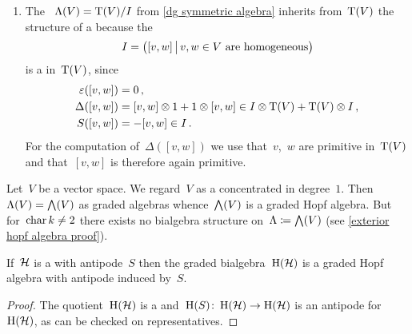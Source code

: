\documentclass[a4paper,10pt,headings=standardclasses]{scrartcl}
\begin{document}
\begin{example}
\begin{enumerate}
\[        (-1)^n
        v_n \dotsm v_1  \,.
      \]%
      It can now be checked on the monomials~$v_1 \dotsm v_n$ that~$S$ is an antipode for~$\dgTensor(V)$, making it a {\dgh}.
      (See \cref{examples for dgh proof} for the explicit calculations.)
    \item
      The {\dga}~$\operatorname{\Lambda}(V) = \operatorname{T}(V)/I$ from \cref{dg symmetric algebra} inherits from~$\dgTensor(V)$ the structure of a {\dgh} because the~{\dgi}
      \[
        I
        =
        \bigl(
          [v,w]
        \suchthat[\big]
          \text{$v,w \in V$ are homogeneous}
        \bigr)
      \]
      is a {\dghi} in~$\dgTensor(V)$, since
      \begin{align*}
        \varepsilon([v,w])
        &=
        0 \,,
      \\
        \Delta([v,w])
        &=
        [v,w] \otimes 1 + 1 \otimes [v,w]
        \in
        I \otimes \operatorname{T}(V) + \operatorname{T}(V) \otimes I \,,
      \\
        S([v,w])
        &=
        -[v,w]
        \in
        I \,.
      \end{align*}
      For the computation of~$\Delta([v,w])$ we use that~$v$,~$w$ are primitive in~$\dgTensor(V)$ and that~$[v,w]$ is therefore again primitive.
  \end{enumerate}
\end{example}

\begin{example}
  \label{exterior hopf algebra}
  Let~$V$ be a vector space.
  We regard~$V$ as a {\dgv} concentrated in degree~$1$.
  Then~$\operatorname{\Lambda}(V) = \bigwedge(V)$ as graded algebras whence~$\bigwedge(V)$ is a graded Hopf algebra.
  But for~$\operatorname{char} k \neq 2$ there exists no bialgebra structure on~$\Lambda \coloneqq \bigwedge(V)$ (see \cref{exterior hopf algebra proof}).
\end{example}

\begin{proposition}
  If~$\mathcal{H}$ is a {\dgh} with antipode~$S$ then the graded bialgebra~$\operatorname{H}(\mathcal{H})$ is a graded Hopf algebra with antipode induced by~$S$.
\end{proposition}

\begin{proof}
  The quotient~$\operatorname{H}(\mathcal{H})$ is a {\dgb} and~$\operatorname{H}(S) \colon \operatorname{H}(\mathcal{H}) \to \operatorname{H}(\mathcal{H})$ is an antipode for~$\operatorname{H}(\mathcal{H})$, as can be checked on representatives.
\end{proof}
\end{document}
